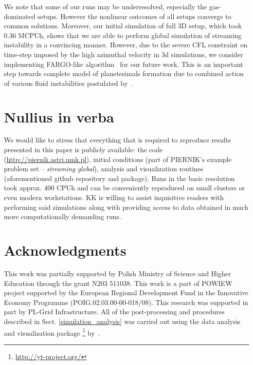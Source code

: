\par We note that some of our runs may be underresolved, especially the
gas-dominated setups. However the nonlinear outcomes of all setups converge to
common solutions. Moreover, our initial simulation of full 3D setup, which took
0.36 MCPUh, shows that we are able to perform global simulation of streaming
instability in a convincing manner. 
However, due to the severe CFL constraint on time-step imposed by the high
azimuthal velocity in 3d simulations, we consider implementing {\sc FARGO}-like
algorithm~\cite{M00} for our future work.
This is an important step towards complete model of planetesimals formation due
to combined action of various fluid instabilities postulated by~\citet{J07}. 
\section*{Nullius in verba}
We would like to stress that everything that is required to reproduce results
presented in this paper is publicly available: the code
(\url{http://piernik.astri.umk.pl}), initial conditions (part of PIERNIK's
example problem set -- {\it streaming global}), analysis and visualization
routines (aforementioned github repository and \yt{} package). Runs in the
basic resolution took approx. 400 CPUh and can be conveniently reproduced on
small clusters or even modern workstations. KK is willing to assist inquisitive
readers with performing said simulations along with providing access to data
obtained in much more computationally demanding runs.
\section*{Acknowledgments}

This work was partially supported by Polish Ministry of Science and Higher
Education through the grant N203 511038. This work is a part of POWIEW project
supported by the European Regional Development Fund in the Innovative Economy
Programme (POIG.02.03.00-00-018/08). This research was supported in part by
PL-Grid Infrastructure. All of the post-processing and procedures described in
Sect. \ref{simulation_analysis}  was carried out using the data analysis and
visualization package \yt{} \footnote{\url{http://yt-project.org/}}
by~\cite{yt}.

%

